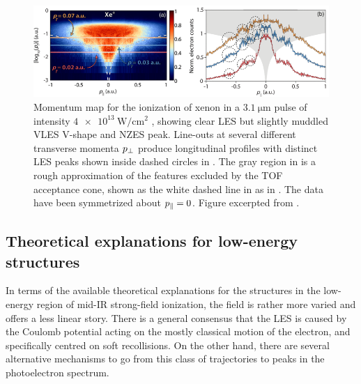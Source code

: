 \begin{figure}[htb]
  \centering
  \subfigure{\label{f6-wolter-prx-original-figure-a}}
  \subfigure{\label{f6-wolter-prx-original-figure-b}}
  \includegraphics[width=\textwidth]{6-LES/Figures/figure6G.png}
  \caption[
  Measured photoelectron momentum map showing multiple members of the LES series, observed by Wolter et al.
  ]{
  Momentum map \protect{} for the ionization of xenon in a $\SI{3.1}{\micro\meter}$ pulse of intensity $\SI{4e13}{\watt/\centi\meter^2}$ \cite{Wolter_PRX}, showing clear LES but slightly muddled VLES V-shape and NZES peak. Line-outs at several different transverse momenta ${p_{\perp}}$ produce longitudinal profiles with distinct LES peaks shown inside dashed circles in \protect{}. The gray region in \protect{} is a rough approximation of the features excluded by the TOF acceptance cone, shown as the white dashed line in \protect{} as in . The data have been symmetrized about ${p_{\parallel}}=0$. 
  Figure excerpted from .
  }
\label{f6-wolter-prx-original-figure}
\end{figure}




\subsection{Theoretical explanations for low-energy structures}
\label{sec:LES-theory}
In terms of the available theoretical explanations for the structures in the low-energy region of mid-{IR} strong-field ionization, the field is rather more varied and offers a less linear story. There is a general consensus that the LES is caused by the Coulomb potential acting on the mostly classical motion of the electron, and specifically centred on soft recollisions. On the other hand, there are several alternative mechanisms to go from this class of trajectories to peaks in the photoelectron spectrum.


